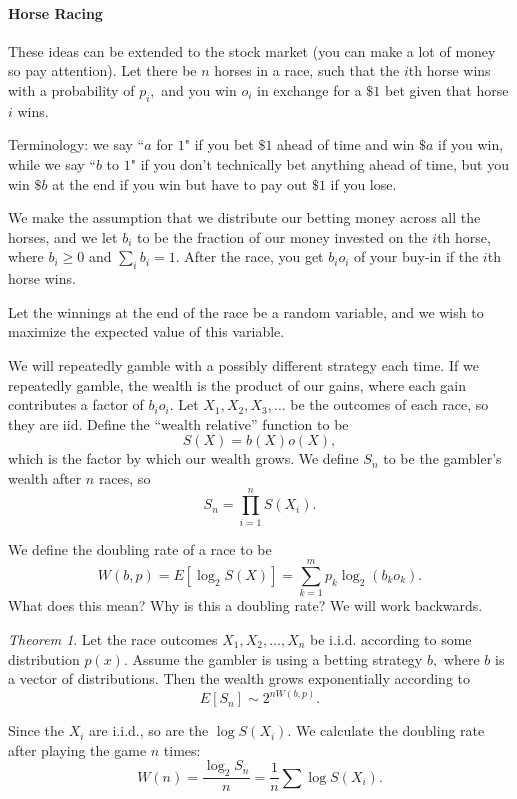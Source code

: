 \documentclass[12pt]{article}
\theoremstyle{remark}
\newtheorem*{theorem}{Theorem}
\begin{document}
\paragraph{Horse Racing}
These ideas can be extended to the stock market (you can make a lot of money so pay attention). Let there be $n$ horses in a race, such that the $i$th horse wins with a probability of $p_i,$ and you win $o_i$ in exchange for a $\$1$ bet given that horse $i$ wins.

\smallskip

Terminology: we say ``$a$ for $1$" if you bet $\$1$ ahead of time and win $\$a$ if you win, while we say ``$b$ to $1$" if you don't technically bet anything ahead of time, but you win $\$b$ at the end if you win but have to pay out $\$1$ if you lose.

\smallskip

We make the assumption that we distribute our betting money across all the horses, and we let $b_i$ to be the fraction of our money invested on the $i$th horse, where $b_i\ge0$ and $\sum_i b_i=1.$ After the race, you get $b_io_i$ of your buy-in if the $i$th horse wins.

Let the winnings at the end of the race be a random variable, and we wish to maximize the expected value of this variable.

We will repeatedly gamble with a possibly different strategy each time. If we repeatedly gamble, the wealth is the product of our gains, where each gain contributes a factor of $b_i o_i.$ Let $X_1,X_2,X_3,\dots$ be the outcomes of each race, so they are iid. Define the ``wealth relative'' function to be
\[S(X)=b(X)o(X),\] which is the factor by which our wealth grows. We define $S_n$ to be the gambler's wealth after $n$ races, so
\[S_n=\prod_{i=1}^nS(X_i).\]

We define the doubling rate of a race to be
\[W(b,p) = E[\log_2 S(X)]=\sum_{k=1}^mp_k\log_2 (b_ko_k).\]
What does this mean? Why is this a doubling rate? We will work backwards.
\begin{theorem}
Let the race outcomes $X_1,X_2,\dots,X_n$ be i.i.d. according to some distribution $p(x).$ Assume the gambler is using a betting strategy $b,$ where $b$ is a vector of distributions. Then the wealth grows exponentially according to
\[E[S_n]\sim 2^{nW(b,p)}.\]
\end{theorem}
Since the $X_i$ are i.i.d., so are the $\log S(X_i).$ We calculate the doubling rate after playing the game $n$ times:
\[W(n) = \frac{\log_2 S_n}{n}=\frac{1}{n}\sum\log S(X_i).\]
\end{document}

